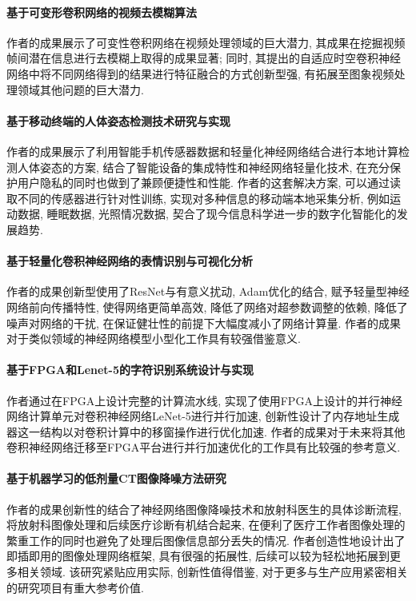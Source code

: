 \documentclass[]{ctexart}
\begin{document}
\paragraph{基于可变形卷积网络的视频去模糊算法\cite{deblur}} 作者的成果展示了可变性卷积网络在视频处理领域的巨大潜力, 其成果在挖掘视频帧间潜在信息进行去模糊上取得的成果显著; 同时, 其提出的自适应时空卷积神经网络中将不同网络得到的结果进行特征融合的方式创新型强, 有拓展至图象视频处理领域其他问题的巨大潜力. 

\paragraph{基于移动终端的人体姿态检测技术研究与实现\cite{bodyPosition}} 作者的成果展示了利用智能手机传感器数据和轻量化神经网络结合进行本地计算检测人体姿态的方案, 结合了智能设备的集成特性和神经网络轻量化技术, 在充分保护用户隐私的同时也做到了兼顾便捷性和性能. 作者的这套解决方案, 可以通过读取不同的传感器进行针对性训练, 实现对多种信息的移动端本地采集分析, 例如运动数据, 睡眠数据, 光照情况数据, 契合了现今信息科学进一步的数字化智能化的发展趋势. 

\paragraph{基于轻量化卷积神经网络的表情识别与可视化分析\cite{faceExp}} 作者的成果创新型使用了ResNet与有意义扰动, Adam优化的结合, 赋予轻量型神经网络前向传播特性, 使得网络更简单高效, 降低了网络对超参数调整的依赖, 降低了噪声对网络的干扰, 在保证健壮性的前提下大幅度减小了网络计算量. 作者的成果对于类似领域的神经网络模型小型化工作具有较强借鉴意义. 

\paragraph{基于FPGA和Lenet-5的字符识别系统设计与实现\cite{lenet-5}} 作者通过在FPGA上设计完整的计算流水线, 实现了使用FPGA上设计的并行神经网络计算单元对卷积神经网络LeNet-5进行并行加速, 创新性设计了内存地址生成器这一结构以对卷积计算中的移窗操作进行优化加速. 作者的成果对于未来将其他卷积神经网络迁移至FPGA平台进行并行加速优化的工作具有比较强的参考意义. 

\paragraph{基于机器学习的低剂量CT图像降噪方法研究\cite{ctDenoise}} 作者的成果创新性的结合了神经网络图像降噪技术和放射科医生的具体诊断流程, 将放射科图像处理和后续医疗诊断有机结合起来, 在便利了医疗工作者图像处理的繁重工作的同时也避免了处理后图像信息部分丢失的情况. 作者创造性地设计出了即插即用的图像处理网络框架, 具有很强的拓展性, 后续可以较为轻松地拓展到更多相关领域. 该研究紧贴应用实际, 创新性值得借鉴, 对于更多与生产应用紧密相关的研究项目有重大参考价值. 
\end{document}
